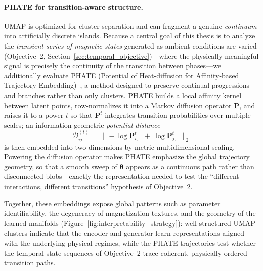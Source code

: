 \documentclass[letterpaper, 12, one column]{article}
\begin{document}
{\paragraph{PHATE for transition-aware structure.}
UMAP is optimized for cluster separation and can fragment a genuine \emph{continuum} into artificially discrete islands. Because a central goal of this thesis is to analyze the \emph{transient series of magnetic states} generated as ambient conditions are varied (Objective~2, Section~\ref{sec:temporal_objective})---where the physically meaningful signal is precisely the continuity of the transition between phases---we additionally evaluate PHATE (Potential of Heat-diffusion for Affinity-based Trajectory Embedding)~\cite{moon2019phate}, a method designed to preserve continual progressions and branches rather than only clusters. PHATE builds a local affinity kernel between latent points, row-normalizes it into a Markov diffusion operator $\mathbf{P}$, and raises it to a power $t$ so that $\mathbf{P}^{t}$ integrates transition probabilities over multiple scales; an information-geometric \emph{potential distance}
\begin{equation}\label{eq:phate_potential}
\mathcal{D}_{ij}^{(t)}=\big\lVert\, -\log \mathbf{P}^{t}_{i,:}\;+\;\log \mathbf{P}^{t}_{j,:}\,\big\rVert_2
\end{equation}
is then embedded into two dimensions by metric multidimensional scaling. Powering the diffusion operator makes PHATE emphasize the global trajectory geometry, so that a smooth sweep of $\boldsymbol{\theta}$ appears as a continuous path rather than disconnected blobs---exactly the representation needed to test the ``different interactions, different transitions'' hypothesis of Objective~2.

Together, these embeddings expose global patterns such as parameter identifiability, the degeneracy of magnetization textures, and the geometry of the learned manifolds (Figure~\ref{fig:interpretability_strategy}): well-structured UMAP clusters indicate that the encoder and generator learn representations aligned with the underlying physical regimes, while the PHATE trajectories test whether the temporal state sequences of Objective~2 trace coherent, physically ordered transition paths.}
\end{document}
